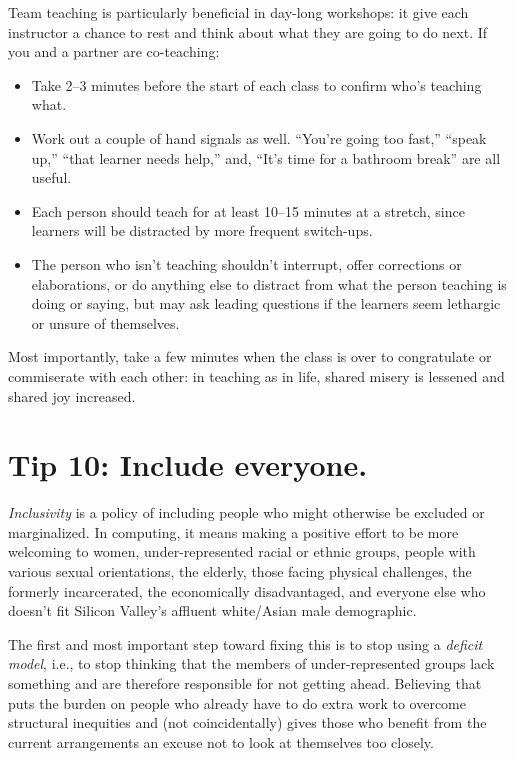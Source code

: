 \documentclass[10pt,letterpaper]{article}
\newcommand{\rulemajor}[1]{\section{#1}}
\begin{document}
Team teaching is particularly beneficial in day-long workshops:
it give each instructor a chance to rest and think about what they are going to do next.
If you and a partner are co-teaching:

\begin{itemize}

\item
  Take 2--3 minutes before the start of each class
  to confirm who's teaching what.

\item
  Work out a couple of hand signals as well.
  ``You're going too fast,''
  ``speak up,''
  ``that learner needs help,''
  and, ``It's time for a bathroom break'' are all useful.

\item
  Each person should teach for at least 10--15 minutes at a stretch,
  since learners will be distracted by more frequent switch-ups.

\item
  The person who isn't teaching shouldn't interrupt,
  offer corrections or elaborations,
  or do anything else to distract from what the person teaching is doing or saying,
  but may ask leading questions
  if the learners seem lethargic or unsure of themselves.

\end{itemize}

Most importantly,
take a few minutes when the class is over to congratulate or commiserate with each other:
in teaching as in life,
shared misery is lessened and shared joy increased.

\rulemajor{Tip 10: Include everyone.}

\emph{Inclusivity} is a policy of including people who might otherwise be excluded or marginalized.
In computing,
it means making a positive effort to be more welcoming to women,
under-represented racial or ethnic groups,
people with various sexual orientations,
the elderly,
those facing physical challenges,
the formerly incarcerated,
the economically disadvantaged,
and everyone else who doesn't fit Silicon Valley's affluent white/Asian male demographic.

The first and most important step toward fixing this is
to stop using a \emph{deficit model},
i.e.,
to stop thinking that the members of under-represented groups lack something
and are therefore responsible for not getting ahead.
Believing that puts the burden on people who already have to do extra work to overcome structural inequities
and (not coincidentally) gives those who benefit from the current arrangements
an excuse not to look at themselves too closely.
\end{document}
